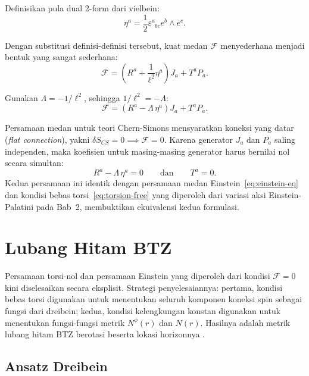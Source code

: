\noindent Definisikan pula dual 2-form dari vielbein:
\begin{equation}
    \eta^a = \frac{1}{2}\varepsilon^a_{\phantom{a}bc} e^b \wedge e^c.
\end{equation}
 
\noindent Dengan substitusi definisi-definisi tersebut, kuat medan $\mathcal{F}$ menyederhana menjadi bentuk yang sangat sederhana:
\begin{equation}
    \mathcal{F} = \left( R^a + \frac{1}{\ell^2} \eta^a \right) J_a + T^a P_a.
\end{equation}
 
\noindent Gunakan $\Lambda = -1/\ell^2$, sehingga $1/\ell^2 = -\Lambda$:
\begin{equation}
    \mathcal{F} = \left( R^a - \Lambda\, \eta^a \right) J_a + T^a P_a.
\end{equation}
 
\noindent Persamaan medan untuk teori Chern-Simons mensyaratkan koneksi yang datar (\textit{flat connection}), yakni $\delta S_{CS} = 0 \implies \mathcal{F} = 0$. Karena generator $J_a$ dan $P_a$ saling independen, maka koefisien untuk masing-masing generator harus bernilai nol secara simultan:
\begin{equation}
    R^a - \Lambda\, \eta^a = 0 \qquad \text{dan} \qquad T^a = 0.
\end{equation}
Kedua persamaan ini identik dengan persamaan medan Einstein~\eqref{eq:einstein-eq} dan kondisi bebas torsi~\eqref{eq:torsion-free} yang diperoleh dari variasi aksi Einstein-Palatini pada Bab~2, membuktikan ekuivalensi kedua formulasi.

\section{Lubang Hitam BTZ}
\label{sec:b4-btzrot}
 
Persamaan torsi-nol dan persamaan Einstein yang diperoleh dari kondisi $\mathcal{F} = 0$ kini diselesaikan secara eksplisit. Strategi penyelesaiannya: pertama, kondisi bebas torsi digunakan untuk menentukan seluruh komponen koneksi spin sebagai fungsi dari dreibein; kedua, kondisi kelengkungan konstan digunakan untuk menentukan fungsi-fungsi metrik $N^\phi(r)$ dan $N(r)$. Hasilnya adalah metrik lubang hitam BTZ berotasi beserta lokasi horizonnya \cite{banados1992, banados1993, carlip1995btz, brown1986central}.
 
\subsection{Ansatz Dreibein}
\label{b42-sec:intro}
 
